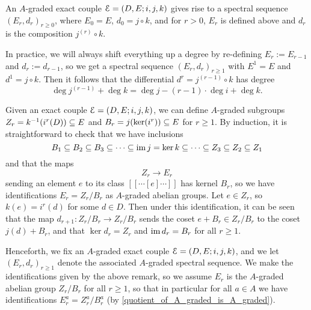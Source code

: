 \documentclass[../main.tex]{subfiles}
\begin{document}
\begin{definition}
    An $A$-graded exact couple $\mathcal E=(D,E;i,j,k)$ gives rise to a spectral sequence $(E_r,d_r)_{r\geq0}$, where $E_0=E$, $d_0=j\circ k$, and for $r>0$, $E_r$ is defined above and $d_r$ is the composition $j^{(r)}\circ k$.

    In practice, we will always shift everything up a degree by re-defining $E_r:= E_{r-1}$ and $d_r:= d_{r-1}$, so we get a spectral sequence $(E_r,d_r)_{r\geq1}$ with $E^1=E$ and $d^1=j\circ k$. Then it follows that the differential $d^r=j^{(r-1)}\circ k$ has degree
    \[\deg j^{(r-1)}+\deg k=\deg j-(r-1)\cdot\deg i+\deg k.\]
\end{definition}

\begin{remark}
    Given an exact couple $\mathcal E=(D,E;i,j,k)$, we can define $A$-graded subgroups $Z_r=k^{-1}(i^r(D))\subseteq E$ and $B_r=j(\ker(i^r))\subseteq E$ for $r\geq1$. By induction, it is straightforward to check that we have inclusions
    \[B_1\subseteq B_2\subseteq B_3\subseteq\cdots\subseteq\operatorname{im} j=\ker k\subseteq\cdots\subseteq Z_3\subseteq Z_2\subseteq Z_1\]
    and that the maps
    \[Z_r\to E_r\]
    sending an element $e$ to its class $[[\cdots[e]\cdots]]$ has kernel $B_r$, so we have identifications $E_r=Z_r/B_r$ as $A$-graded abelian groups. Let $e\in Z_r$, so $k(e)=i^r(d)$ for some $d\in D$. Then under this identification, it can be seen that the map $d_{r+1}:Z_r/B_r\to Z_r/B_r$ sends the coset $e+B_r\in Z_r/B_r$ to the coset $j(d)+B_r$, and that $\ker d_r=Z_r$ and $\operatorname{im} d_r=B_r$ for all $r\geq1$.
\end{remark}

Henceforth, we fix an $A$-graded exact couple $\mathcal E=(D,E;i,j,k)$, and we let $(E_r,d_r)_{r\geq1}$ denote the associated $A$-graded spectral sequence. We make the identifications given by the above remark, so we assume $E_r$ is the $A$-graded abelian group $Z_r/B_r$ for all $r\geq1$, so that in particular for all $a\in A$ we have identifications $E_r^a=Z_r^a/B_r^a$ (by \autoref{quotient_of_A_graded_is_A_graded}).
\end{document}
